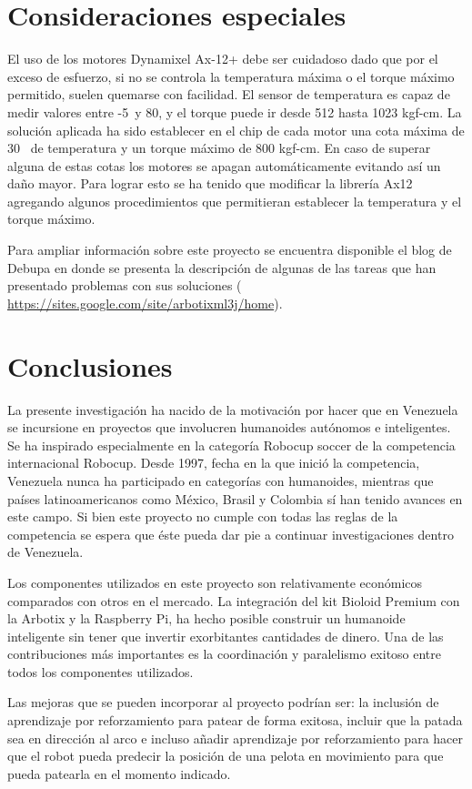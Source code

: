 \documentclass[conference, letterpaper]{IEEEtranMC1}
\begin{document}
\section{Consideraciones especiales}
\label{sec:consideraciones}

El uso de los motores Dynamixel Ax-12+ debe ser cuidadoso dado que por el exceso de esfuerzo, si no se controla la temperatura máxima o el torque máximo permitido, suelen quemarse con facilidad. El sensor de temperatura es capaz de medir valores entre -5\celsius~y 80\celsius, y el torque puede ir desde 512 hasta 1023 kgf-cm. La solución aplicada ha sido establecer en el chip de cada motor una cota máxima de 30\celsius~ de temperatura y un torque máximo de 800 kgf-cm. En caso de superar alguna de estas cotas los motores se apagan automáticamente evitando así un daño mayor. Para lograr esto se ha tenido que modificar la librería Ax12 agregando algunos procedimientos que permitieran establecer la temperatura y el torque máximo.

Para ampliar información sobre este proyecto se encuentra disponible el blog de Debupa en donde se presenta la descripción de algunas de las tareas que han presentado problemas con sus soluciones (\url{ https://sites.google.com/site/arbotixml3j/home}).


\section{Conclusiones}
\label{sec:Conclusiones}

La presente investigación ha nacido de la motivación por hacer que en Venezuela se incursione en proyectos que involucren humanoides autónomos e inteligentes. Se ha inspirado especialmente en la categoría Robocup soccer de la competencia internacional Robocup. Desde 1997, fecha en la que inició la competencia, Venezuela nunca ha participado en categorías con humanoides, mientras que países latinoamericanos como México, Brasil y Colombia sí han tenido avances en este campo. Si bien este proyecto no cumple con todas las reglas de la competencia se espera que éste pueda dar pie a continuar investigaciones dentro de Venezuela. 

Los componentes utilizados en este proyecto son relativamente económicos comparados con otros en el mercado. La integración del kit Bioloid Premium con la Arbotix y la Raspberry Pi, ha hecho posible construir un humanoide inteligente sin tener que invertir exorbitantes cantidades de dinero. Una de las contribuciones más importantes es la coordinación y paralelismo exitoso entre todos los componentes utilizados.

Las mejoras que se pueden incorporar al proyecto podrían ser: la inclusión de aprendizaje por reforzamiento para patear de forma exitosa, incluir que la patada sea en dirección al arco e incluso añadir aprendizaje por reforzamiento para hacer que el robot pueda predecir la posición de una pelota en movimiento para que pueda patearla en el momento indicado.  






\end{document}
